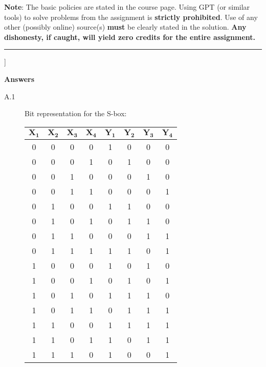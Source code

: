 \documentclass{article}
\begin{document}
\raggedbottom
{}
\vspace*{-0.4cm}
{ \sf \textbf{{\color{red}Note}}: {\color{blue} The basic policies are stated in the course page. Using GPT (or similar tools) to solve problems from the assignment is \textbf{strictly prohibited}. Use of any other (possibly online) source(s) \textbf{must} be clearly stated in the solution. \textbf{Any dishonesty, if caught, will yield zero credits for the entire assignment.}}}\\
\hrule
\begin{description}[leftmargin=3pt]
	\item[A. [Block Ciphers : \!\!\!\! $\mathbf{8 + 10 + (3\times 4) = 30\ points.}$\!\!\!]] 
	\begin{framed}
		{\bf Answers}
		\begin{description}
			\item[A.1] Bit representation for the S-box:
			\begin{center}
				\begin{tabular}{|c|c|c|c||c|c|c|c|}
					\hline $\mathbf{X_1}$ & $\mathbf{X_2}$ & $\mathbf{X_3}$ & $\mathbf{X_4}$ & $\mathbf{Y_1}$ & $\mathbf{Y_2}$ & $\mathbf{Y_3}$ & $\mathbf{Y_4}$ \\
					\hline 0 & 0 & 0 & 0 & 1 & 0 & 0 & 0 \\
					\hline 0 & 0 & 0 & 1 & 0 & 1 & 0 & 0 \\
					\hline 0 & 0 & 1 & 0 & 0 & 0 & 1 & 0 \\
					\hline 0 & 0 & 1 & 1 & 0 & 0 & 0 & 1 \\
					\hline 0 & 1 & 0 & 0 & 1 & 1 & 0 & 0 \\
					\hline 0 & 1 & 0 & 1 & 0 & 1 & 1 & 0 \\
					\hline 0 & 1 & 1 & 0 & 0 & 0 & 1 & 1 \\
					\hline 0 & 1 & 1 & 1 & 1 & 1 & 0 & 1 \\
					\hline 1 & 0 & 0 & 0 & 1 & 0 & 1 & 0 \\
					\hline 1 & 0 & 0 & 1 & 0 & 1 & 0 & 1 \\
					\hline 1 & 0 & 1 & 0 & 1 & 1 & 1 & 0 \\
					\hline 1 & 0 & 1 & 1 & 0 & 1 & 1 & 1 \\
					\hline 1 & 1 & 0 & 0 & 1 & 1 & 1 & 1 \\
					\hline 1 & 1 & 0 & 1 & 1 & 0 & 1 & 1 \\
					\hline 1 & 1 & 1 & 0 & 1 & 0 & 0 & 1 \\

\end{tabular}
\end{center}
\end{description}
\end{framed}
\end{description}
\end{document}
